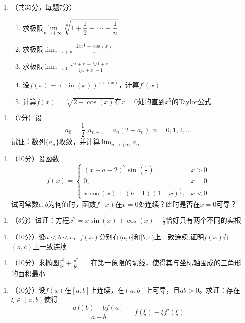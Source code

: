 \documentclass[hidelinks]{article}
\theoremstyle{definition}
\theoremstyle{remark}
\theoremstyle{plain}
\theoremstyle{dotless}
\begin{document}
\begin{enumerate}[一、]
    \item（共35分，每题7分）
    \begin{enumerate}[(1).] 
        \item 求极限$\displaystyle\lim_{n\to+\infty}\sqrt[\leftroot{-2}\uproot{2}n]{1+\frac{1}{2}+\dots+\frac{1}{n}}$
        \item 求极限$\displaystyle\lim_{x\to+\infty}\frac{2xe^{\frac{1}{x}}+\cos(x)}{x}$
        \item  求极限$\displaystyle\lim_{x\to0}\frac{\sqrt{1+x}-\sqrt[6]{1+x}}{\sqrt[3]{1+x}-1}$
        \item 设$f(x)=(\sin(x))^{\cos(x)}$，计算$f'(x)$
        \item 计算$f(x)=\sqrt[3]{2-\cos(x)}$在$x=0$处的直到$x^5$的Taylor公式
    \end{enumerate}
\end{enumerate}
\begin{enumerate}[二、]
    \item（7分）设
    \[a_0=\frac{1}{2},a_{n+1}=a_n(2-a_n),n=0,1,2,\dots\]
    试证：数列$\{a_n\}$收敛，并计算$\displaystyle\lim_{n\to+\infty}a_n$
\end{enumerate}
\begin{enumerate}[三、]
    \item（10分）设函数
    \[f(x)=\begin{cases}
    (x+a-2)^2\sin(\frac{1}{x}),&x>0\\
    0,&x=0\\
    x\cos(x)+(b-1)(1-x)^{\frac{1}{x}},&x<0
    \end{cases}\]
    试问常数$a,b$为何值时，函数$f(x)$在$x=0$处连续？此时是否在$x=0$可导？
\end{enumerate}
\begin{enumerate}[四、]
    \item（8分）试证：方程$x^2=x\sin(x)+\cos(x)-\frac{1}{2}$恰好只有两个不同的实根
\end{enumerate}
\begin{enumerate}[五、]
    \item（10分）设$a<b<c$，$f(x)$分别在$(a,b]$和$[b,c)$上一致连续,证明$f(x)$在$(a,c)$上一致连续
\end{enumerate}
\begin{enumerate}[六、]
    \item（10分）求椭圆$\frac{x^2}{a^2}+\frac{y^2}{b^2}=1$在第一象限的切线，使得其与坐标轴围成的三角形的面积最小
\end{enumerate}
\begin{enumerate}[七、]
    \item（10分）设$f(x)$在$[a,b]$上连续，在$(a,b)$上可导，且$ab>0$。求证：存在$\xi\in(a,b)$使得
    \[\frac{af(b)-bf(a)}{a-b}=f(\xi)-\xi f'(\xi)\]
\end{enumerate}
\end{document}
